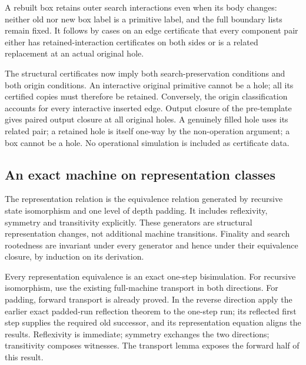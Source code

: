 
A rebuilt box retains outer search interactions even when its body
changes: neither old nor new box label is a primitive label, and the full
boundary lists remain fixed. It follows by cases on an edge certificate
that every component pair either has retained-interaction certificates on
both sides or is a related replacement at an actual original hole.



The structural certificates now imply both search-preservation conditions
and both origin conditions. An interactive original primitive cannot be a
hole; all its certified copies must therefore be retained. Conversely, the
origin classification accounts for every interactive inserted edge.
Output closure of the pre-template gives paired output closure at all
original holes. A genuinely filled hole uses its related pair; a retained
hole is itself one-way by the non-operation argument; a box cannot be a
hole. No operational simulation is included as certificate data.



\subsection{An exact machine on representation classes}

The representation relation is the equivalence relation generated by
recursive state isomorphism and one level of depth padding. It includes
reflexivity, symmetry and transitivity explicitly. These generators are
structural representation changes, not additional machine transitions.
Finality and search rootedness are invariant under every generator and
hence under their equivalence closure, by induction on its derivation.




Every representation equivalence is an exact one-step bisimulation.
For recursive isomorphism, use the existing full-machine transport in both
directions. For padding, forward transport is already proved. In the reverse
direction apply the earlier exact padded-run reflection theorem to the
one-step run; its reflected first step supplies the required old successor,
and its representation equation aligns the results. Reflexivity is immediate;
symmetry exchanges the two directions; transitivity composes witnesses.
The transport lemma exposes the forward half of this result.

